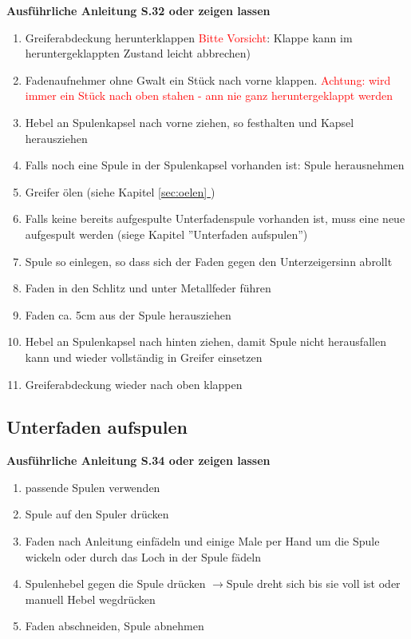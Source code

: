 \documentclass{\basedir/fablab-document}
\newcommand{\pfeil}{\ensuremath{\rightarrow}}
\newcommand*{\fullref}[1]{\hyperref[{#1}]{\autoref*{#1} \nameref*{#1}}}
\begin{document}
\vspace{1em}
\textbf{Ausführliche Anleitung S.32 oder zeigen lassen}
\begin{enumerate}
	\item Greiferabdeckung herunterklappen \textcolor{red}{Bitte Vorsicht}: Klappe kann im heruntergeklappten Zustand leicht abbrechen)
	\item Fadenaufnehmer ohne Gwalt ein Stück nach vorne klappen. \textcolor{red}{Achtung: wird immer ein Stück nach oben stahen - ann nie ganz heruntergeklappt werden}
	\item Hebel an Spulenkapsel nach vorne ziehen, so festhalten und Kapsel herausziehen 
	\item Falls noch eine Spule in der Spulenkapsel vorhanden ist: Spule herausnehmen
	\item Greifer ölen (siehe Kapitel \fullref{sec:oelen})
	\item Falls keine bereits aufgespulte Unterfadenspule vorhanden ist, muss eine neue aufgespult werden (siege Kapitel ''Unterfaden aufspulen'')
	\item Spule so einlegen, so dass sich der Faden gegen den Unterzeigersinn abrollt
	\item Faden in den Schlitz und unter Metallfeder führen
	\item Faden ca. 5cm aus der Spule herausziehen
	\item Hebel an Spulenkapsel nach hinten ziehen, damit Spule nicht herausfallen kann und wieder vollständig in Greifer einsetzen
	\item Greiferabdeckung wieder nach oben klappen
\end{enumerate}

\subsection{Unterfaden aufspulen}
\textbf{Ausführliche Anleitung S.34 oder zeigen lassen}
\begin{enumerate}
	\item passende Spulen verwenden
	\item Spule auf den Spuler drücken
	\item Faden nach Anleitung einfädeln und einige Male per Hand um die Spule wickeln oder durch das Loch in der Spule fädeln
	\item Spulenhebel gegen die Spule drücken \pfeil Spule dreht sich bis sie voll ist oder manuell Hebel wegdrücken
	\item Faden abschneiden, Spule abnehmen
\end{enumerate}
\end{document}
